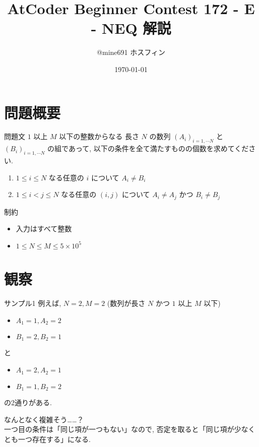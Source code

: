 \documentclass[dvipdfmx,12pt]{beamer}%
\title{AtCoder Beginner Contest 172 - E - NEQ 解説}
\author{@mine691 ホスフィン}
\date{\today}
\begin{document}
\maketitle
%
\section{問題概要}
\begin{frame} %
\begin{block}{問題文}
$ 1 $ 以上 $ M $ 以下の整数からなる
長さ $ N $ の数列 $ (A_i)_{i = 1, \cdots N}$ と $ (B_i)_{i = 1, \cdots N}$
の組であって, 以下の条件を全て満たすものの個数を求めてください.
\begin{enumerate}
	\item $ 1 \leq i \leq N $ なる任意の $ i $ について $ A_i \neq B_i $
	\item $ 1 \leq i < j \leq N $ なる任意の $ (i, j) $ について $ A_i \neq A_j $ かつ $ B_i \neq B_j $
\end{enumerate} 
\end{block}

\begin{exampleblock}{制約}
	\begin{itemize}
		\item 入力はすべて整数
		\item $1 \leq N \leq M \leq 5 \times 10 ^ {5}$
	\end{itemize}

\section{観察}
\end{exampleblock}
\end{frame}
\begin{frame}
\begin{exampleblock}{サンプル1}
例えば, $ N = 2, M = 2$ (数列が長さ $ N $ かつ $ 1 $ 以上 $ M $ 以下)
\begin{itemize}
	\item $ A_1 = 1, A_2 = 2$
	\item $ B_1 = 2, B_2 = 1$
\end{itemize}
と
\begin{itemize}
	\item $ A_1 = 2, A_2 = 1$
	\item $ B_1 = 1, B_2 = 2$
\end{itemize}
の2通りがある.
\end{exampleblock}
なんとなく複雑そう……？\\
一つ目の条件は「同じ項が一つもない」なので, 否定を取ると「同じ項が少なくとも一つ存在する」になる.
\end{frame}
\end{document}
